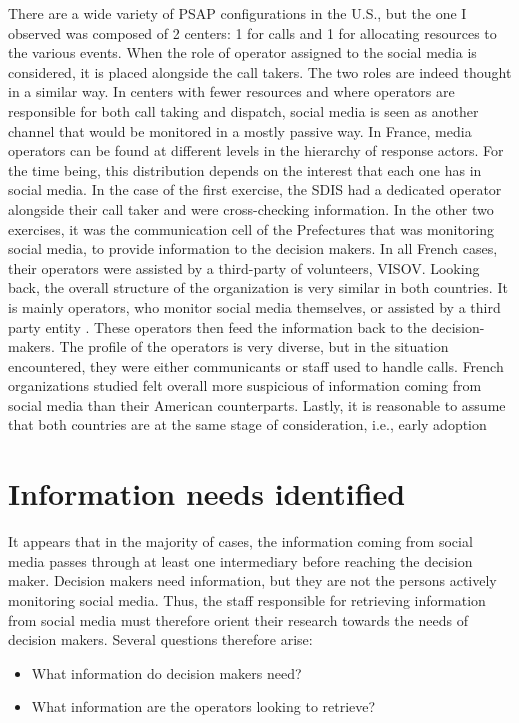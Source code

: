 There are a wide variety of PSAP configurations in the U.S., but the one I observed was composed of 2 centers:
1 for calls and 1 for allocating resources to the various events.
When the role of operator assigned to the social media is considered, it is placed alongside the call takers.
The two roles are indeed thought in a similar way.
In centers with fewer resources and where operators are responsible for both call taking and dispatch,
social media is seen as another channel that would be monitored in a mostly passive way.
In France, media operators can be found at different levels in the hierarchy of response actors.
For the time being, this distribution depends on the interest that each one has in social media.
In the case of the first exercise, the SDIS had a dedicated operator alongside their call taker
and were cross-checking information.
In the other two exercises, it was the communication cell of the Prefectures that was
monitoring social media, to provide information to the decision makers.
In all French cases, their operators were assisted by a third-party of volunteers, VISOV.
Looking back, the overall structure of the organization is very similar in both countries.
It is mainly operators, who monitor social media themselves, or
assisted by a third party entity \parencite{batardIntegrerContributionsCitoyennes2021}.
These operators then feed the information back to the decision-makers.
The profile of the operators is very diverse, but in the situation encountered, they
were either communicants or staff used to handle calls.
French organizations studied felt overall more suspicious of information coming from
social media \parencite{castagninoWhatCanWe2019} than their American counterparts.
Lastly, it is reasonable to assume that both countries are at the same stage of consideration, i.e., early adoption

\section{Information needs identified}
It appears that in the majority of cases, the information coming from social media passes through at least one intermediary before reaching the decision maker.
Decision makers need information, but they are not the persons actively monitoring social media.
Thus, the staff responsible for retrieving information from social media must therefore orient their research towards the needs of decision makers.
Several questions therefore arise:

\begin{itemize}
    \item What information do decision makers need?
    \item What information are the operators looking to retrieve?
\end{itemize}

